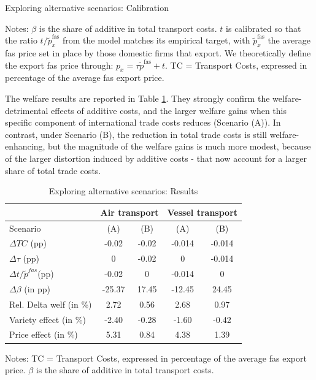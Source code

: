 \documentclass[a4paper,11pt]{article}
\begin{document}
\begin{table}[htb]
  \centering
  \caption{Exploring alternative scenarios: Calibration }\label{tab:calib_TC_appendix}
\begin{center}
	
\end{center}
{\parbox[l]{13cm}{ \vspace{4pt}\footnotesize{Notes: $\beta$ is the share of additive in total transport costs. $t$ is calibrated so that the ratio $t/\widetilde{p}^{\text{fas}}_x$ from the model matches its empirical target, with $\widetilde{p}^{\text{fas}}_x$ the average fas price set in place by those domestic firms that export. We theoretically define the export fas price through: $p_x = \tau \widetilde{p}^{\text{fas}} +t$. TC = Transport Costs, expressed in percentage of the average fas export price. }}}
\end{table}

The welfare results are reported in Table \ref{tab:results_model_appendix}. They strongly confirm the welfare-detrimental effects of additive costs, and the larger welfare gains when this specific component of international trade costs reduces (Scenario (A)). In contrast, under Scenario (B), the reduction in total trade costs is still welfare-enhancing, but the magnitude of the welfare gains is much more modest, because of the larger distortion induced by additive costs - that now account for a larger share of total trade costs.

\begin{table}[htb]
  \centering
  \caption{Exploring alternative scenarios: Results }\label{tab:results_model_appendix}
\begin{center}
\begin{tabular}{l|cc|cc}
\hline \hline
& \multicolumn{2}{|c|}{Air transport} & \multicolumn{2}{|c}{Vessel transport} \\ \hline
Scenario & (A) & (B) & (A) & (B) \\ \hline
$\Delta TC$ (pp)&	-0.02	&-0.02	&-0.014&	-0.014 \\
$\Delta \tau$ (pp)&	0	&-0.02&	0&	-0.014 \\
$\Delta t/\widetilde{p}^{fas} $(pp)&	-0.02	&0	&-0.014&	0 \\
$\Delta \beta$ (in pp)	&-25.37&	17.45	&-12.45&	24.45 \\ \hline
Rel. Delta welf (in \%)&	2.72&	0.56	&2.68	&0.97 \\
\hspace{1em}Variety effect (in \%)	&-2.40&	-0.28&	-1.60	&-0.42 \\
\hspace{1em}Price effect (in \%)	&5.31 &0.84&	4.38	&1.39 \\
\hline \hline
\end{tabular}
\end{center}
{\parbox[l]{10cm}{ \vspace{4pt}\footnotesize{Notes: TC = Transport Costs, expressed in percentage of the average fas export price. $\beta$ is the share of additive in total transport costs.}}}
\end{table}
\end{document}
